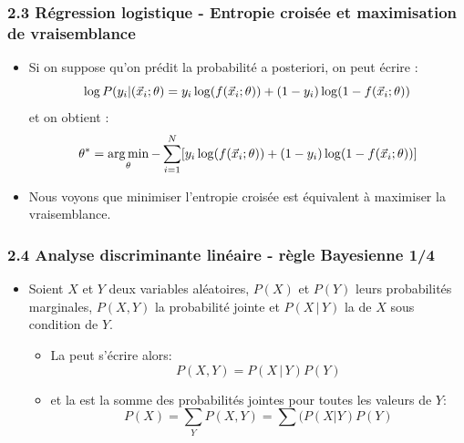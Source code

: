\begin{frame}
  \frametitle{2.3 Régression logistique - Entropie croisée et maximisation de vraisemblance}
  \begin{itemize}
    \item Si on suppose qu'on prédit la probabilité a posteriori, on peut écrire : 
    \begin{equation*}
    \log P(y_i|(\vec{x}_i; \theta) = y_i \log (f(\vec{x}_i; \theta)) + (1-y_i)\log (1-f(\vec{x}_i; \theta))
    \end{equation*}
    et on obtient : 
    \begin{equation*}
    \theta^{\ast} = \operatorname*{arg\,min}_{\theta} - \sum_{i=1}^N [y_i \log (f(\vec{x}_i; \theta)) + (1-y_i)\log (1-f(\vec{x}_i; \theta))]
    \end{equation*}
    \item Nous voyons que minimiser l'entropie croisée est équivalent à maximiser la vraisemblance.
  \end{itemize}
\end{frame}



\begin{frame}
\frametitle{2.4 Analyse discriminante linéaire - règle Bayesienne 1/4}
  \begin{itemize}
  \item Soient $X$ et $Y$ deux variables aléatoires, $P(X)$ et $P(Y)$ leurs probabilités marginales, $P(X,Y)$ la probabilité jointe et $P(X\,|\,Y)$ la  de $X$ sous condition de $Y$.
    \begin{itemize}
    \item La  peut s'écrire alors:
    \begin{equation}
      P(X,Y) = P(X\,|\,Y)P(Y)
    \end{equation}
    \item et la  est la somme des probabilités jointes pour toutes les valeurs de $Y$:
    \begin{equation}
      P(X) = \sum_Y P(X,Y) = \sum(P(X|Y)P(Y)
    \end{equation}
  \end{itemize}
  \end{itemize}
\end{frame}

